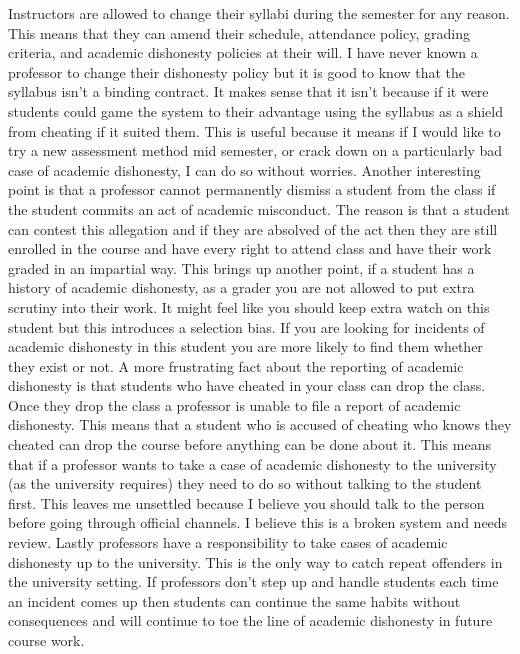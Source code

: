 \documentclass{article}
\begin{document}
Instructors are allowed to change their syllabi during the semester for any reason. This means that they can amend their schedule, attendance policy, grading criteria, and academic dishonesty policies at their will. I have never known a professor to change their dishonesty policy but it is good to know that the syllabus isn't a binding contract. It makes sense that it isn't because if it were students could game the system to their advantage using the syllabus as a shield from cheating if it suited them. This is useful because it means if I would like to try a new assessment method mid semester, or crack down on a particularly bad case of academic dishonesty, I can do so without worries. 
Another interesting point is that a professor cannot permanently dismiss a student from the class if the student commits an act of academic misconduct. The reason is that a student can contest this allegation and if they are absolved of the act then they are still enrolled in the course and have every right to attend class and have their work graded in an impartial way. This brings up another point, if a student has a history of academic dishonesty, as a grader you are not allowed to put extra scrutiny into their work. It might feel like you should keep extra watch on this student but this introduces a selection bias. If you are looking for incidents of academic dishonesty in this student you are more likely to find them whether they exist or not. 
A more frustrating fact about the reporting of academic dishonesty is that students who have cheated in your class can drop the class. Once they drop the class a professor is unable to file a report of academic dishonesty. This means that a student who is accused of cheating who knows they cheated can drop the course before anything can be done about it. This means that if a professor wants to take a case of academic dishonesty to the university (as the university requires) they need to do so without talking to the student first. This leaves me unsettled because I believe you should talk to the person before going through official channels. I believe this is a broken system and needs review. 
Lastly professors have a responsibility to take cases of academic dishonesty up to the university. This is the only way to catch repeat offenders in the university setting. If professors don't step up and handle students each time an incident comes up then students can continue the same habits without consequences and will continue to toe the line of academic dishonesty in future course work. 
\end{document}
